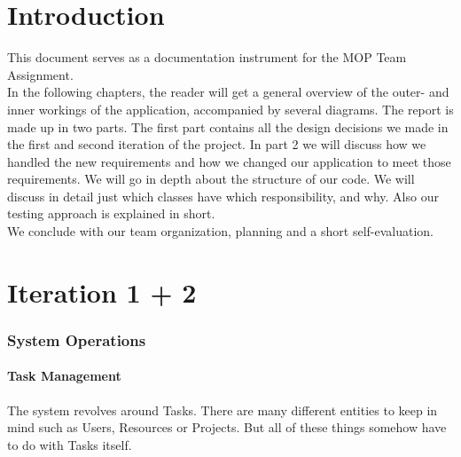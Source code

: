 



\maakvoorblad

\newpage
\thispagestyle{empty}
\mbox{}

\newpage
\maakvoorblad

\newpage

\tableofcontents

\newpage

\part{Introduction}
		This document serves as a documentation instrument for the MOP Team Assignment.\\
		In the following chapters, the reader will get a general overview of the outer- and inner workings of the application, accompanied by several diagrams. The report is made up in two parts. The first part contains all the design decisions we made in the first and second iteration of the project. In part 2 we will discuss how we handled the new requirements and how we changed our application to meet those requirements.
		We will go in depth about the structure of our code. We will discuss in detail just which classes have which responsibility, and why. Also our testing approach is explained in short.\\
		We conclude with our team organization, planning and a short self-evaluation.

\part{Iteration 1 + 2}

	\section{System Operations}
		\subsection{Task Management}
			The system revolves around Tasks. There are many different entities to keep in mind such as Users, Resources or Projects.
			But all of these things somehow have to do with Tasks itself.
